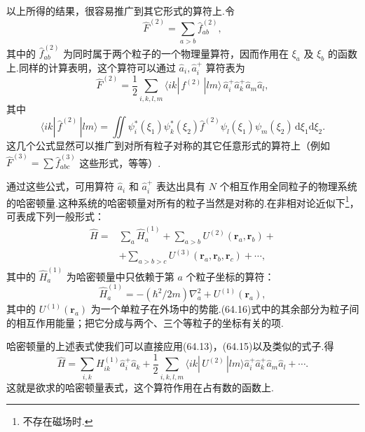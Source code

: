 以上所得的结果，很容易推广到其它形式的算符上.令
\begin{equation}
  \hat{F}^{(2)}=\sum_{a>b}\hat{f}_{ab}^{(2)},
\end{equation}
其中的 $\hat{f}_{ab}^{(2)}$ 为同时属于两个粒子的一个物理量算符，因而作用在 $\xi_a$ 及 $\xi_b$ 的函数上.同样的计算表明，这个算符可以通过 $\hat{a}_i,\hat{a}_i^{+}$ 算符表为
\begin{equation}
  \hat{F}^{(2)}=\frac{1}{2}\sum_{i,k,l,m}\langle ik|\,f^{(2)}\,|lm\rangle\,\hat{a}_i^{+}\hat{a}_k^{+}\hat{a}_m\hat{a}_l,
\end{equation}
其中
\begin{equation*}
  \langle ik|\,\hat{f}^{(2)}\,|lm\rangle=\iint\psi_i^{*}(\xi_1)\psi_k^{*}(\xi_2)\hat{f}^{(2)}\psi_l(\xi_1)\psi_m(\xi_2)\,\mathrm{d}\xi_1\mathrm{d}\xi_2.
\end{equation*}
这几个公式显然可以推广到对所有粒子对称的其它任意形式的算符上（例如 $\hat{F}^{(3)}=\sum\hat{f}_{abc}^{(3)}$ 这些形式，等等）.

通过这些公式，可用算符 $\hat{a}_i$ 和 $\hat{a}_i^{+}$ 表达出具有 $N$ 个相互作用全同粒子的物理系统的哈密顿量.这种系统的哈密顿量对所有的粒子当然是对称的.在非相对论近似下\footnote{不存在磁场时.}，可表成下列一般形式：
\begin{equation}
\begin{aligned}
  \hat{H}={}&\sum_a\hat{H}_a^{(1)}+\sum_{a>b}U^{(2)}(\boldsymbol{r}_a,\boldsymbol{r}_b)+{}\\
  &+\sum_{a>b>c}U^{(3)}(\boldsymbol{r}_a,\boldsymbol{r}_b,\boldsymbol{r}_c)+\cdots,
\end{aligned}
\end{equation}
其中的 $\hat{H}_a^{(1)}$ 为哈密顿量中只依赖于第 $a$ 个粒子坐标的算符：
\begin{equation}
  \hat{H}_a^{(1)}=-\left(\hbar^2/2m\right)\nabla_a^2+U^{(1)}(\boldsymbol{r}_a),
\end{equation}
其中的 $U^{(1)}(\boldsymbol{r}_a)$ 为一个单粒子在外场中的势能.(64.16)式中的其余部分为粒子间的相互作用能量；把它分成与两个、三个等粒子的坐标有关的项.

哈密顿量的上述表式使我们可以直接应用(64.13)，(64.15)以及类似的式子.得
\begin{equation}
  \hat{H}=\sum_{i,k}H_{ik}^{(1)}\hat{a}_i^{+}\hat{a}_k+\frac{1}{2}\sum_{i,k,l,m}\langle ik|\,U^{(2)}\,|lm\rangle\hat{a}_i^{+}\hat{a}_k^{+}\hat{a}_m\hat{a}_l+\cdots.
\end{equation}
这就是欲求的哈密顿量表式，这个算符作用在占有数的函数上.

